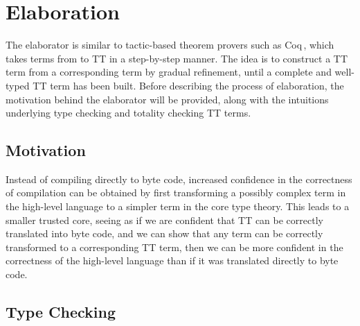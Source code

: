 \section{Elaboration}
\label{sec:elaboration}
The elaborator is similar to tactic-based theorem provers such as Coq\,\citep{Coq:manual},
which takes terms from \IdrisM{} to TT in a step-by-step manner. The idea is to
construct a TT term from a corresponding \IdrisM{} term by gradual refinement,
until a complete and well-typed TT term has been built. Before describing the
process of elaboration, the motivation behind the elaborator will be provided,
along with the intuitions underlying type checking and totality checking TT terms. 

\subsection{Motivation}
Instead of compiling \IdrisM{} directly to byte code, increased confidence in
the correctness of compilation can be obtained by first transforming a possibly
complex term in the high-level language to a simpler term in the core type
theory. This leads to a smaller trusted core, seeing as if we are
confident that TT can be correctly translated into byte code, and we can
show that any \IdrisM{} term can be correctly transformed
to a corresponding TT term, then we can be more confident in the correctness of
the high-level \IdrisM{} language than if it was translated directly to byte
code.

\subsection{Type Checking}
\label{sec:type-checking}


